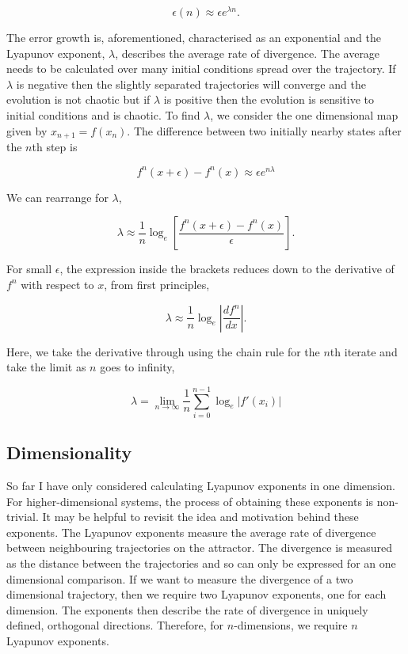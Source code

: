 \documentclass[aps,prl,reprint,10pt,amsmath,amssymb,superscriptaddress,a4paper]{revtex4-2}
\begin{document}
\begin{equation}
    \epsilon(n) \approx \epsilon e^{\lambda n}.
\end{equation}

The error growth is, aforementioned, characterised as an exponential and the Lyapunov exponent, $\lambda$, describes the average rate of divergence. The average needs to be 
calculated over many initial conditions spread over the trajectory. If $\lambda$ is negative then the slightly separated trajectories will converge and the evolution is not 
chaotic but if $\lambda$ is positive then the evolution is sensitive to initial conditions and is chaotic. To find $\lambda$, we consider the one dimensional map given by 
$x_{n+1}=f(x_n)$. The difference between two initially nearby states after the $n$th step is 

\begin{equation}
    f^n(x+\epsilon) - f^n(x) \approx \epsilon e^{n\lambda}
\end{equation}

We can rearrange for $\lambda$,

\begin{equation*}
    \lambda \approx \frac{1}{n}\log_{e}\left[\frac{f^n(x+\epsilon)-f^n(x)}{\epsilon}\right].
\end{equation*}

For small $\epsilon$, the expression inside the brackets reduces down to the derivative of $f^n$ with respect to $x$, from first principles,

\begin{equation}
    \lambda \approx \frac{1}{n}\log_{e}\left|\frac{df^n}{dx}\right|.
\end{equation}

Here, we take the derivative through using the chain rule for the $n$th iterate and take the limit as $n$ goes to infinity,

\begin{equation*}
    \lambda = \lim_{n\rightarrow \infty} \frac{1}{n}\sum_{i=0}^{n-1}\log_e\left|f'(x_i)\right|
\end{equation*}

\subsection{Dimensionality}
So far I have only considered calculating Lyapunov exponents in one dimension. For higher-dimensional systems, the process of obtaining these exponents is non-trivial. It may be 
helpful to revisit the idea and motivation behind these exponents. The Lyapunov exponents measure the average rate of divergence between neighbouring trajectories on the attractor.
The divergence is measured as the distance between the trajectories and so can only be expressed for an one dimensional comparison. If we want to measure the divergence of a two 
dimensional trajectory, then we require two Lyapunov exponents, one for each dimension. The exponents then describe the rate of divergence in uniquely defined, orthogonal directions.
Therefore, for $n$-dimensions, we require $n$ Lyapunov exponents.
\end{document}
